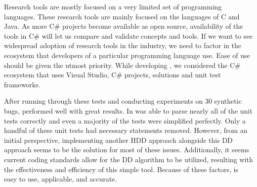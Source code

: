 Research tools are mostly focused on a very limited set of programming languages. These research tools are mainly focused on the languages of C and Java. As more C\# projects become available as open source, availability of the tools in C\# will let us compare and validate concepts and tools. If we want to see widespread adoption of research tools in the industry, we need to factor in the ecosystem that developers of a particular programming language use. Ease of use should be given the utmost priority. While developing \mytool, we considered the C\# ecosystem that uses Visual Studio, C\# projects, solutions and unit test frameworks.

After running through these tests and conducting experiments on 30 synthetic bugs, \mytool performed well with great results. In was able to parse nearly all of the unit tests correctly and even a majority of the tests were simplified perfectly. Only a handful of these unit tests had necessary statements removed. However, from an initial perspective, implementing another HDD approach alongside this DD approach seems to be the solution for most of these issues. Additionally, it seems current coding standards allow for the DD algorithm to be utilized, resulting with the effectiveness and efficiency of this simple tool. Because of these factors, \mytool is easy to use, applicable, and accurate.   